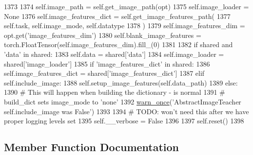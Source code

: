 \begin{DoxyCode}
1373 
1374         self.image\_path = self.get\_image\_path(opt)
1375         self.image\_loader = \textcolor{keywordtype}{None}
1376         self.image\_features\_dict = self.get\_image\_features\_path(
1377             self.task, self.image\_mode, self.datatype
1378         )
1379         self.image\_features\_dim = opt.get(\textcolor{stringliteral}{'image\_features\_dim'})
1380         self.blank\_image\_features = torch.FloatTensor(self.image\_features\_dim).fill\_(0)
1381 
1382         \textcolor{keywordflow}{if} shared \textcolor{keywordflow}{and} \textcolor{stringliteral}{'data'} \textcolor{keywordflow}{in} shared:
1383             self.data = shared[\textcolor{stringliteral}{'data'}]
1384             self.image\_loader = shared[\textcolor{stringliteral}{'image\_loader'}]
1385             \textcolor{keywordflow}{if} \textcolor{stringliteral}{'image\_features\_dict'} \textcolor{keywordflow}{in} shared:
1386                 self.image\_features\_dict = shared[\textcolor{stringliteral}{'image\_features\_dict'}]
1387         \textcolor{keywordflow}{elif} self.include\_image:
1388             self.setup\_image\_features(self.data\_path)
1389         \textcolor{keywordflow}{else}:
1390             \textcolor{comment}{# This will happen when building the dictionary - is normal}
1391             \textcolor{comment}{# build\_dict sets image\_mode to 'none'}
1392             \hyperlink{namespaceparlai_1_1utils_1_1misc_acf146e70ea7f6867969a7c2b545d4b4b}{warn\_once}(\textcolor{stringliteral}{'AbstractImageTeacher self.include\_image was False'})
1393 
1394         \textcolor{comment}{# TODO: won't need this after we have proper logging levels set}
1395         self.\_\_verbose = \textcolor{keyword}{False}
1396 
1397         self.reset()
1398 
\end{DoxyCode}


\subsection{Member Function Documentation}
\mbox{\label{classparlai_1_1core_1_1teachers_1_1AbstractImageTeacher_a2735899e5787c14da39443179db6c84b}} 

